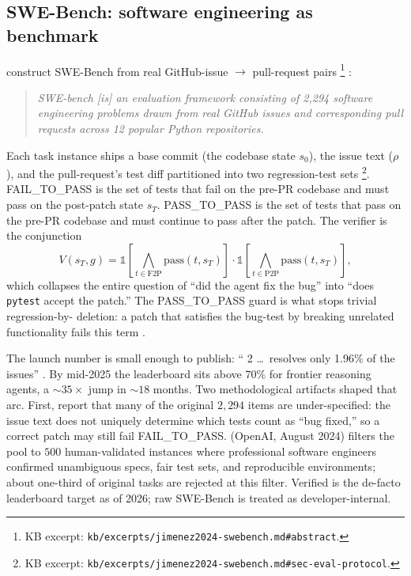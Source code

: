 \subsection{SWE-Bench: software engineering as benchmark}
\label{sec:agentic-swebench}

\citet{jimenez2024-swebench} construct SWE-Bench from real
GitHub-issue $\to$ pull-request pairs%
\footnote{KB excerpt: \texttt{kb/excerpts/jimenez2024-swebench.md\#abstract}.}
\citep[\S{}abstract]{jimenez2024-swebench}:

\begin{quote}\itshape
SWE-bench [is] an evaluation framework consisting of 2,294 software
engineering problems drawn from real GitHub issues and corresponding
pull requests across 12 popular Python repositories.
\end{quote}

Each task instance ships a base commit (the codebase state $s_0$),
the issue text ($\rho$), and the pull-request's test diff partitioned
into two regression-test sets%
\footnote{KB excerpt: \texttt{kb/excerpts/jimenez2024-swebench.md\#sec-eval-protocol}.}.
\textsf{FAIL\_TO\_PASS} is the set of tests that fail on the pre-PR
codebase and must pass on the post-patch state $s_T$.
\textsf{PASS\_TO\_PASS} is the set of tests that pass on the pre-PR
codebase and must continue to pass after the patch. The verifier is
the conjunction
\[
V(s_T, g) = \mathbb{1}\!\left[\bigwedge_{t \in \mathrm{F2P}} \mathrm{pass}(t, s_T)\right] \cdot \mathbb{1}\!\left[\bigwedge_{t \in \mathrm{P2P}} \mathrm{pass}(t, s_T)\right],
\]
which collapses the entire question of ``did the agent fix the bug''
into ``does \texttt{pytest} accept the patch.'' The
\textsf{PASS\_TO\_PASS} guard is what stops trivial regression-by-
deletion: a patch that satisfies the bug-test by breaking unrelated
functionality fails this term \citep[\S{}sec-eval-protocol]{jimenez2024-swebench}.

The launch number is small enough to publish:
`` 2 \ldots\ resolves only 1.96\% of the issues''
\citep[\S{}sec-headline]{jimenez2024-swebench}. By mid-2025 the
 leaderboard sits above $70\%$ for frontier reasoning
agents, a $\sim 35\times$ jump in $\sim 18$ months. Two methodological
artifacts shaped that arc. First, \citet{jimenez2024-swebench} report
that many of the original $2{,}294$ items are under-specified: the
issue text does not uniquely determine which tests count as ``bug
fixed,'' so a correct patch may still fail \textsf{FAIL\_TO\_PASS}.
 (OpenAI, August 2024) filters the pool to $500$
human-validated instances where professional software engineers
confirmed unambiguous specs, fair test sets, and reproducible
environments; about one-third of original tasks are rejected at this
filter. Verified is the de-facto leaderboard target as of 2026;
raw SWE-Bench is treated as developer-internal.

